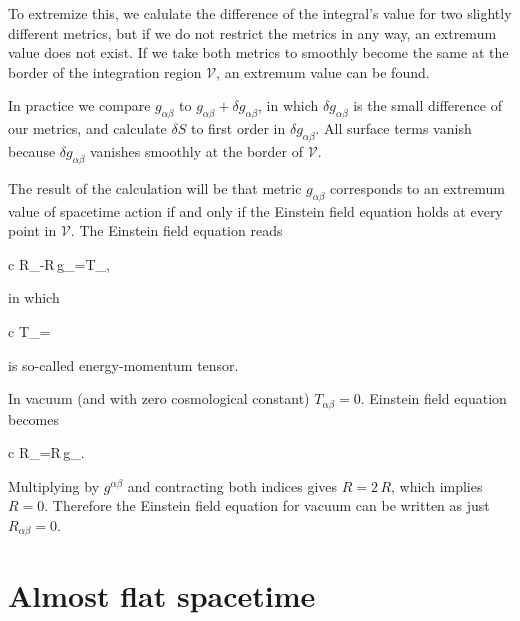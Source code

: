\documentclass[11pt,oneside%
]{memoir}
\newenvironment{eqna}{\begin{IEEEeqnarray*}{c}}{\end{IEEEeqnarray*}\ignorespacesafterend}
\begin{document}

To extremize this, we calulate the difference of the integral's value for two slightly different metrics, but if we do not restrict the metrics in any way, an extremum value does not exist. If we take both metrics to smoothly become the same at the border of the integration region \(\mathcal{V}\), an extremum value can be found.

In practice we compare \(g_{\alpha\beta}\) to \(g_{\alpha\beta}+\delta g_{\alpha\beta}\), in which \(\delta g_{\alpha\beta}\) is the small difference of our metrics, and calculate \(\delta S\) to first order in \(\delta g_{\alpha\beta}\). All surface terms vanish because \(\delta g_{\alpha\beta}\) vanishes smoothly at the border of \(\mathcal{V}\).






The result of the calculation will be that metric \(g_{\alpha\beta}\) corresponds to an extremum value of spacetime action if and only if the Einstein field equation holds at every point in \(\mathcal{V}\). The Einstein field equation reads
\begin{eqna}
R_{\alpha\beta}-R\,g_{\alpha\beta}=T_{\alpha\beta},%
\end{eqna}
in which
\begin{eqna}
T_{\alpha\beta}=
\end{eqna}
is so-called energy-momentum tensor.

In vacuum (and with zero cosmological constant) \(T_{\alpha\beta}=0\). Einstein field equation becomes
\begin{eqna}
R_{\alpha\beta}=R\,g_{\alpha\beta}.
\end{eqna}
Multiplying by \(g^{\alpha\beta}\) and contracting both indices gives \(R=2\,R\), which implies \(R=0\). Therefore the Einstein field equation for vacuum can be written as just \(R_{\alpha\beta}=0\).
















\chapter{Almost flat spacetime}
\end{document}
